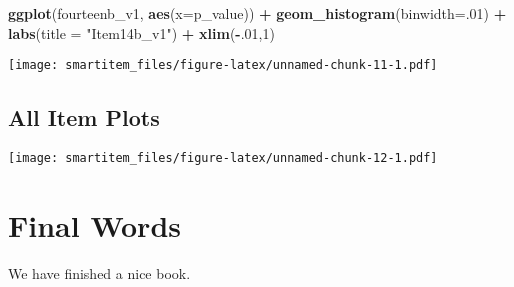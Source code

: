 \documentclass[]{book}
\newenvironment{Shaded}{\begin{snugshade}}{\end{snugshade}}
\newcommand{\KeywordTok}[1]{\textcolor[rgb]{0.13,0.29,0.53}{\textbf{#1}}}
\newcommand{\DataTypeTok}[1]{\textcolor[rgb]{0.13,0.29,0.53}{#1}}
\newcommand{\DecValTok}[1]{\textcolor[rgb]{0.00,0.00,0.81}{#1}}
\newcommand{\StringTok}[1]{\textcolor[rgb]{0.31,0.60,0.02}{#1}}
\newcommand{\OperatorTok}[1]{\textcolor[rgb]{0.81,0.36,0.00}{\textbf{#1}}}
\newcommand{\NormalTok}[1]{#1}
\theoremstyle{definition}
\theoremstyle{definition}
\theoremstyle{definition}
\theoremstyle{remark}
\begin{document}
\begin{Shaded}
\begin{Highlighting}[]
\KeywordTok{ggplot}\NormalTok{(fourteenb_v1, }\KeywordTok{aes}\NormalTok{(}\DataTypeTok{x=}\NormalTok{p_value)) }\OperatorTok{+}\StringTok{ }\KeywordTok{geom_histogram}\NormalTok{(}\DataTypeTok{binwidth=}\NormalTok{.}\DecValTok{01}\NormalTok{) }\OperatorTok{+}\StringTok{ }\KeywordTok{labs}\NormalTok{(}\DataTypeTok{title =} \StringTok{"Item14b_v1"}\NormalTok{) }\OperatorTok{+}\StringTok{ }\KeywordTok{xlim}\NormalTok{(}\OperatorTok{-}\NormalTok{.}\DecValTok{01}\NormalTok{,}\DecValTok{1}\NormalTok{)}
\end{Highlighting}
\end{Shaded}

\texttt{[image: smartitem\_files/figure-latex/unnamed-chunk-11-1.pdf]}

\section{All Item Plots}\label{all-item-plots}

\begin{Shaded}
\end{Shaded}

\texttt{[image: smartitem\_files/figure-latex/unnamed-chunk-12-1.pdf]}

\chapter{Final Words}\label{final-words}

We have finished a nice book.


\end{document}
